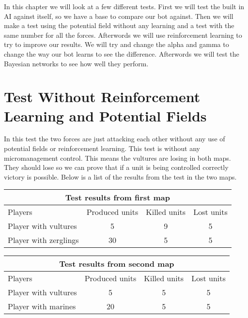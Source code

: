 
In this chapter we will look at a few different tests.
First we will test the built in AI against itself, so we have a base to compare our bot against. Then we will make a test using the potential field without any learning and a test with the same number for all the forces. Afterwords we will use reinforcement learning to try to improve our results. We will try and change the alpha and gamma to change the way our bot learns to see the difference. Afterwords we will test the Bayesian networks to see how well they perform.

\section{Test Without Reinforcement Learning and Potential Fields} %
In this test the two forces are just attacking each other without any use of potential fields or reinforcement learning. This test is without any micromanagement control. This means the vultures are losing in both maps. They should lose so we can prove that if a unit is being controlled correctly victory is possible. Below is a list of the results from the test in the two maps.\\

\begin{centering}
\begin{table}
 \begin{tabular}{|l|c|c|c|}
	\multicolumn{4}{c}{Test results from first map} \\
	\hline
		Players & Produced units & Killed units & Lost units\\
	\hline
	\hline
		Player with vultures & 5 & 9 & 5 \\
	\hline
		Player with zerglings & 30 & 5 & 5\\
	\hline

\end{tabular}
\end{table}
\end{centering}
\newpage

\begin{centering}
\begin{table}
 \begin{tabular}{|l|c|c|c|}
	\multicolumn{4}{c}{Test results from second map} \\
	\hline
	Players & Produced units & Killed units & Lost units\\
	\hline
		Player with vultures & 5 & 5 & 5\\
	\hline
		Player with marines & 20 & 5 & 5\\
	\hline

\end{tabular}
\end{table}
\end{centering}


